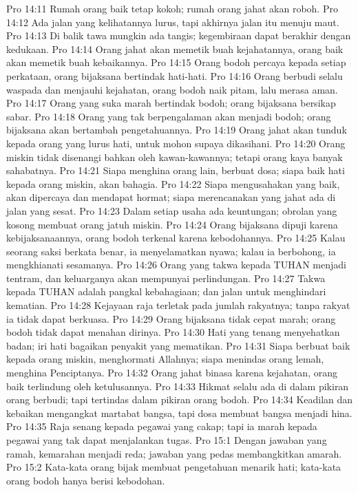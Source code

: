 Pro 14:11  Rumah orang baik tetap kokoh; rumah orang jahat akan roboh.
Pro 14:12  Ada jalan yang kelihatannya lurus, tapi akhirnya jalan itu menuju maut.
Pro 14:13  Di balik tawa mungkin ada tangis; kegembiraan dapat berakhir dengan kedukaan.
Pro 14:14  Orang jahat akan memetik buah kejahatannya, orang baik akan memetik buah kebaikannya.
Pro 14:15  Orang bodoh percaya kepada setiap perkataan, orang bijaksana bertindak hati-hati.
Pro 14:16  Orang berbudi selalu waspada dan menjauhi kejahatan, orang bodoh naik pitam, lalu merasa aman.
Pro 14:17  Orang yang suka marah bertindak bodoh; orang bijaksana bersikap sabar.
Pro 14:18  Orang yang tak berpengalaman akan menjadi bodoh; orang bijaksana akan bertambah pengetahuannya.
Pro 14:19  Orang jahat akan tunduk kepada orang yang lurus hati, untuk mohon supaya dikasihani.
Pro 14:20  Orang miskin tidak disenangi bahkan oleh kawan-kawannya; tetapi orang kaya banyak sahabatnya.
Pro 14:21  Siapa menghina orang lain, berbuat dosa; siapa baik hati kepada orang miskin, akan bahagia.
Pro 14:22  Siapa mengusahakan yang baik, akan dipercaya dan mendapat hormat; siapa merencanakan yang jahat ada di jalan yang sesat.
Pro 14:23  Dalam setiap usaha ada keuntungan; obrolan yang kosong membuat orang jatuh miskin.
Pro 14:24  Orang bijaksana dipuji karena kebijaksanaannya, orang bodoh terkenal karena kebodohannya.
Pro 14:25  Kalau seorang saksi berkata benar, ia menyelamatkan nyawa; kalau ia berbohong, ia mengkhianati sesamanya.
Pro 14:26  Orang yang takwa kepada TUHAN menjadi tentram, dan keluarganya akan mempunyai perlindungan.
Pro 14:27  Takwa kepada TUHAN adalah pangkal kebahagiaan; dan jalan untuk menghindari kematian.
Pro 14:28  Kejayaan raja terletak pada jumlah rakyatnya; tanpa rakyat ia tidak dapat berkuasa.
Pro 14:29  Orang bijaksana tidak cepat marah; orang bodoh tidak dapat menahan dirinya.
Pro 14:30  Hati yang tenang menyehatkan badan; iri hati bagaikan penyakit yang mematikan.
Pro 14:31  Siapa berbuat baik kepada orang miskin, menghormati Allahnya; siapa menindas orang lemah, menghina Penciptanya.
Pro 14:32  Orang jahat binasa karena kejahatan, orang baik terlindung oleh ketulusannya.
Pro 14:33  Hikmat selalu ada di dalam pikiran orang berbudi; tapi tertindas dalam pikiran orang bodoh.
Pro 14:34  Keadilan dan kebaikan mengangkat martabat bangsa, tapi dosa membuat bangsa menjadi hina.
Pro 14:35  Raja senang kepada pegawai yang cakap; tapi ia marah kepada pegawai yang tak dapat menjalankan tugas.
Pro 15:1  Dengan jawaban yang ramah, kemarahan menjadi reda; jawaban yang pedas membangkitkan amarah.
Pro 15:2  Kata-kata orang bijak membuat pengetahuan menarik hati; kata-kata orang bodoh hanya berisi kebodohan.
